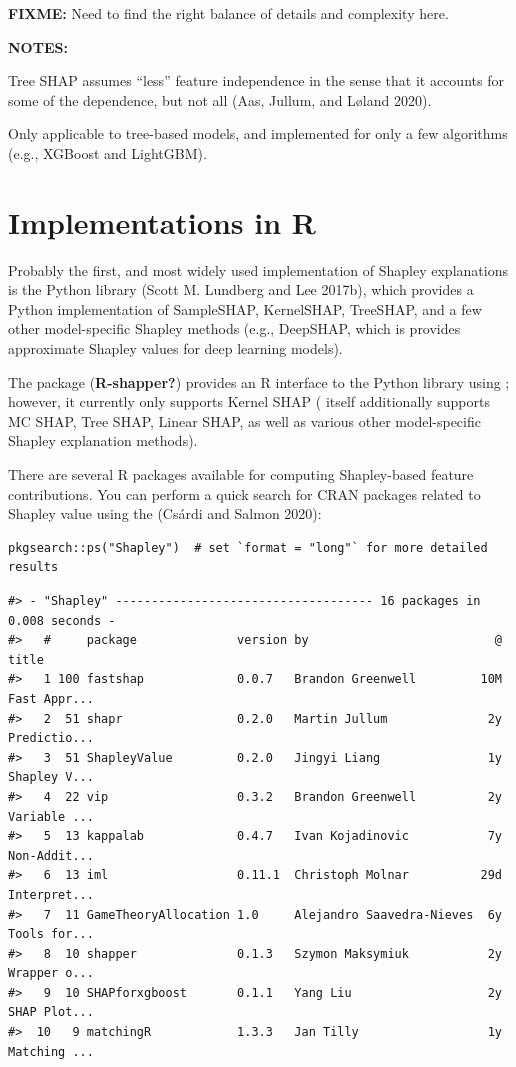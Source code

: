 \textbf{FIXME:} Need to find the right balance of details and complexity here.

\textbf{NOTES:}

Tree SHAP assumes ``less'' feature independence in the sense that it accounts for some of the dependence, but not all (Aas, Jullum, and Løland 2020).

Only applicable to tree-based models, and implemented for only a few algorithms (e.g., XGBoost and LightGBM).

\hypertarget{r-pkgs}{%
\section{Implementations in R}\label{r-pkgs}}

Probably the first, and most widely used implementation of Shapley explanations is the Python  library (Scott M. Lundberg and Lee 2017b), which provides a Python implementation of SampleSHAP, KernelSHAP, TreeSHAP, and a few other model-specific Shapley methods (e.g., DeepSHAP, which is provides approximate Shapley values for deep learning models).

The  package (\textbf{R-shapper?}) provides an R interface to the Python  library using  \citep{R-reticulate}; however, it currently only supports Kernel SHAP ( itself additionally supports MC SHAP, Tree SHAP, Linear SHAP, as well as various other model-specific Shapley explanation methods).

There are several R packages available for computing Shapley-based feature contributions. You can perform a quick search for CRAN packages related to Shapley value using the  (Csárdi and Salmon 2020):

\begin{verbatim}
pkgsearch::ps("Shapley")  # set `format = "long"` for more detailed results
\end{verbatim}

\begin{verbatim}
#> - "Shapley" ------------------------------------ 16 packages in 0.008 seconds -
#>   #     package              version by                          @ title       
#>   1 100 fastshap             0.0.7   Brandon Greenwell         10M Fast Appr...
#>   2  51 shapr                0.2.0   Martin Jullum              2y Predictio...
#>   3  51 ShapleyValue         0.2.0   Jingyi Liang               1y Shapley V...
#>   4  22 vip                  0.3.2   Brandon Greenwell          2y Variable ...
#>   5  13 kappalab             0.4.7   Ivan Kojadinovic           7y Non-Addit...
#>   6  13 iml                  0.11.1  Christoph Molnar          29d Interpret...
#>   7  11 GameTheoryAllocation 1.0     Alejandro Saavedra-Nieves  6y Tools for...
#>   8  10 shapper              0.1.3   Szymon Maksymiuk           2y Wrapper o...
#>   9  10 SHAPforxgboost       0.1.1   Yang Liu                   2y SHAP Plot...
#>  10   9 matchingR            1.3.3   Jan Tilly                  1y Matching ...
\end{verbatim}

